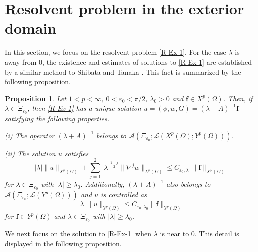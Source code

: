 \documentclass[dvipdfmx,12pt]{article}
\newtheorem{prop}[dfn]{Proposition}
\begin{document}
\vskip5mm
\section{Resolvent problem in the exterior domain} 

In this section, we focus on the resolvent problem \eqref{R-Ex-1}. For the case $\lambda$ is away from 0, the existence and estimates of solutions to \eqref{R-Ex-1} are established by a similar method to Shibata and Tanaka \cite{ShTa04}. This fact is summarized by the following proposition.
\begin{prop}\label{R-Ex-Prop1}
Let $1<p<\infty$, $0<\varepsilon_0<\pi/2$, $\lambda_0>0$ and $\mathbf{f}\in X^p(\Omega)$. 
Then, if $\lambda\in \Xi_{\varepsilon_0}$, then \eqref{R-Ex-1} has a unique solution $u=(\phi,w,G)=(\lambda+A)^{-1}\mathbf{f}$
satisfying the following properties.

\vskip3mm
\noindent
(i) The operator $(\lambda+A)^{-1}$ belongs to $\mathcal{A}(\Xi_{\varepsilon_0}; \mathcal{L}(X^p(\Omega); Y^p(\Omega) ) )$.

\vskip3mm
\noindent
(ii) The solution $u$ satisfies
\begin{equation}\label{R-Ex-prop1-1}
|\lambda | \|u\|_{X^p(\Omega)}+\sum_{j=1}^2|\lambda|^{\frac{1-j}{2}} \|\nabla^j w\|_{L^p(\Omega)}\leq C_{\varepsilon_0 ,\lambda_0}\|\mathbf{f}\|_{X^p(\Omega)}
\end{equation}
for $\lambda\in \Xi_{\varepsilon_0}$ with $|\lambda|\ge \lambda_0$. Additionally, $(\lambda+A)^{-1}$ also belongs to $\mathcal{A}(\Xi_{\varepsilon_0}; \mathcal{L}(Y^p(\Omega) ) )$ and $u$ is controlled as
\begin{equation}\label{R-Ex-prop1-2}
|\lambda | \|u\|_{Y^p(\Omega)}\leq C_{\varepsilon_0 ,\lambda_0}\|\mathbf{f}\|_{Y^p(\Omega)}
\end{equation}
for $\mathbf{f}\in Y^p(\Omega)$ and $\lambda\in \Xi_{\varepsilon_0}$ with $|\lambda|\ge \lambda_0$.
\end{prop}

We next focus on the solution to \eqref{R-Ex-1} when $\lambda$ is near to $0$. This detail is displayed in the following proposition.
\end{document}
